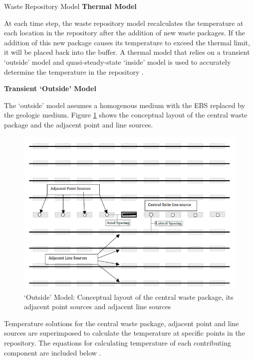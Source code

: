 \documentclass[final]{beamer}
\newlength{\onecolwid}
\newlength{\threecolwid}
\begin{document}
\begin{frame}[t]
\begin{columns}[t,totalwidth=\threecolwid]
\begin{column}{\onecolwid}
\begin{block}{Waste Repository Model}
\vspace{0.7em}
\textbf{Thermal Model}

At each time step, the waste repository model recalculates the temperature at each 
location in the repository after the addition of new waste packages. 
If the addition of this new package causes its temperature to exceed the thermal 
limit, it will be placed back into the buffer.  
A thermal model that relies on a transient `outside' model and quasi-steady-state 
`inside' model is used to accurately determine the temperature in the repository
\cite{sutton_investigations_2011}. 

\vspace{0.7em}
\textbf{Transient `Outside' Model}

The `outside' model assumes a homogenous medium with the \gls{EBS} replaced by the 
geologic medium. 
Figure \ref{fig:conceptual_layout} shows the conceptual layout of the central waste 
package and the adjacent point and line sources. 

\begin{figure}
	\label{fig:conceptual_layout}
	\includegraphics[width=1\linewidth]{outsidemodel}
	\caption{`Outside' Model: Conceptual layout of the central waste package, its adjacent
	point sources and adjacent line sources \cite{sutton_investigations_2011}}
\end{figure}

Temperature solutions for the central waste package, adjacent point and line sources 
are superimposed to calculate the temperature at specific points in the repository.
The equations for calculating temperature of each contributing component 
are included below \cite{sutton_investigations_2011,greenberg_application_2012,huff_numerical_2012}. 


\end{block}
\end{column}
\end{columns}
\end{frame}
\end{document}

